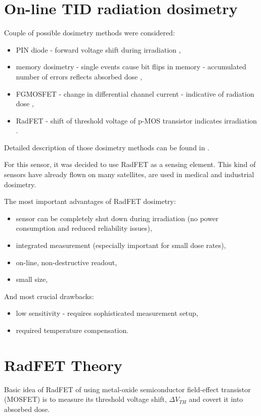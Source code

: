 \section{On-line TID radiation dosimetry}
    Couple of possible dosimetry methods were considered:
    \begin{itemize}
        \item PIN diode - forward voltage shift during irradiation \cite{PIN_dosimetry},
        \item memory dosimetry - single events cause bit flips in memory - accumulated number of errors reflects absorbed dose \cite{RadFET_PhD},
        \item FGMOSFET - change in differential channel current - indicative of radiation dose \cite{FGMOSFET_patent},
        \item RadFET - shift of threshold voltage of p-MOS transistor indicates irradiation \cite{RadFET_PhD}.
    \end{itemize}
    Detailed description of those dosimetry methods can be found in \cite{RadFET_PhD}.

    For this sensor, it was decided to use RadFET as a sensing element. This kind of sensors have already flown on many satellites, are used in medical and industrial dosimetry.

    The most important advantages of RadFET dosimetry:
    \begin{itemize}
        \item sensor can be completely shut down during irradiation (no power consumption and reduced reliability issues),
        \item integrated measurement (especially important for small dose rates),
        \item on-line, non-destructive readout,
        \item small size,
    \end{itemize}
    And most crucial drawbacks:
    \begin{itemize}
        \item low sensitivity - requires sophisticated measurement setup,
        \item required temperature compensation.
    \end{itemize}


\section{RadFET Theory}
    Basic idea of RadFET of using metal-oxide semiconductor field-effect transistor (MOSFET) is to measure its threshold voltage shift, $\Delta V_{TH}$ and covert it into absorbed dose.

